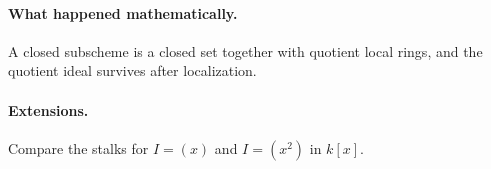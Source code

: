\paragraph{What happened mathematically.}
A closed subscheme is a closed set together with quotient local rings, and the quotient ideal survives after localization.

\paragraph{Extensions.}
Compare the stalks for $I=(x)$ and $I=(x^2)$ in $k[x]$.
\fi
